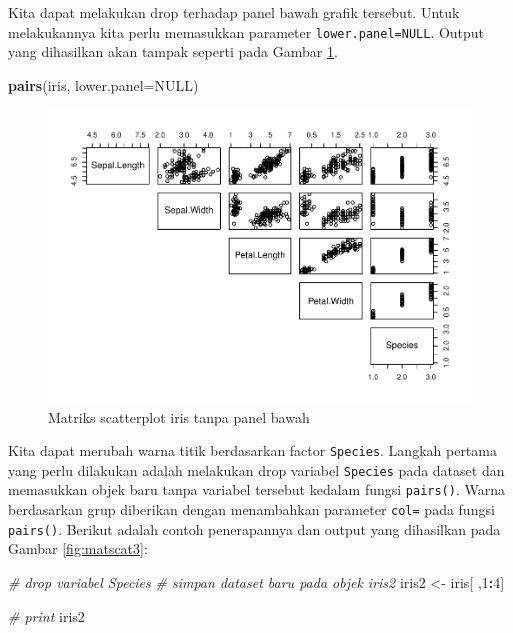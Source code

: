 \documentclass[]{book}
\newenvironment{Shaded}{\begin{snugshade}}{\end{snugshade}}
\newcommand{\KeywordTok}[1]{\textcolor[rgb]{0.13,0.29,0.53}{\textbf{#1}}}
\newcommand{\DataTypeTok}[1]{\textcolor[rgb]{0.13,0.29,0.53}{#1}}
\newcommand{\DecValTok}[1]{\textcolor[rgb]{0.00,0.00,0.81}{#1}}
\newcommand{\StringTok}[1]{\textcolor[rgb]{0.31,0.60,0.02}{#1}}
\newcommand{\CommentTok}[1]{\textcolor[rgb]{0.56,0.35,0.01}{\textit{#1}}}
\newcommand{\OtherTok}[1]{\textcolor[rgb]{0.56,0.35,0.01}{#1}}
\newcommand{\OperatorTok}[1]{\textcolor[rgb]{0.81,0.36,0.00}{\textbf{#1}}}
\newcommand{\NormalTok}[1]{#1}
\begin{document}
Kita dapat melakukan drop terhadap panel bawah grafik tersebut. Untuk
melakukannya kita perlu memasukkan parameter \texttt{lower.panel=NULL}.
Output yang dihasilkan akan tampak seperti pada Gambar
\ref{fig:matscat2}.

\begin{Shaded}
\begin{Highlighting}[]
\KeywordTok{pairs}\NormalTok{(iris, }\DataTypeTok{lower.panel=}\OtherTok{NULL}\NormalTok{)}
\end{Highlighting}
\end{Shaded}

\begin{figure}

{\centering \includegraphics[width=0.8\linewidth]{EnvStat_files/figure-latex/matscat2-1} 

}

\caption{Matriks scatterplot iris tanpa panel bawah}\label{fig:matscat2}
\end{figure}

Kita dapat merubah warna titik berdasarkan factor \texttt{Species}.
Langkah pertama yang perlu dilakukan adalah melakukan drop variabel
\texttt{Species} pada dataset dan memasukkan objek baru tanpa variabel
tersebut kedalam fungsi \texttt{pairs()}. Warna berdasarkan grup
diberikan dengan menambahkan parameter \texttt{col=} pada fungsi
\texttt{pairs()}. Berikut adalah contoh penerapannya dan output yang
dihasilkan pada Gambar \ref{fig:matscat3}:

\begin{Shaded}
\begin{Highlighting}[]
\CommentTok{# drop variabel Species}
\CommentTok{# simpan dataset baru pada objek iris2}
\NormalTok{iris2 <-}\StringTok{ }\NormalTok{iris[ ,}\DecValTok{1}\OperatorTok{:}\DecValTok{4}\NormalTok{]}

\CommentTok{# print}
\NormalTok{iris2}
\end{Highlighting}
\end{Shaded}
\end{document}
